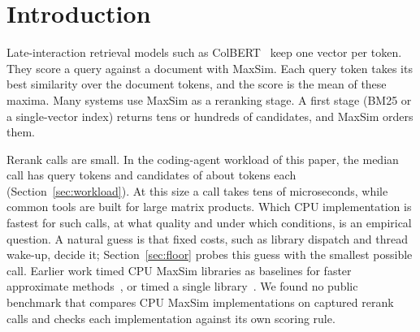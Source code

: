 \section{Introduction}
\label{sec:intro}

Late-interaction retrieval models such as ColBERT~\cite{khattab2020colbert,santhanam2022colbertv2} keep one vector per token.
They score a query against a document with MaxSim.
Each query token takes its best similarity over the document tokens, and the score is the mean of these maxima.
Many systems use MaxSim as a reranking stage.
A first stage (BM25 or a single-vector index) returns tens or hundreds of candidates, and MaxSim orders them.

Rerank calls are small.
In the coding-agent workload of this paper, the median call has  query tokens and  candidates of about  tokens each (Section~\ref{sec:workload}).
At this size a call takes tens of microseconds, while common tools are built for large matrix products.
Which CPU implementation is fastest for such calls, at what quality and under which conditions, is an empirical question.
A natural guess is that fixed costs, such as library dispatch and thread wake-up, decide it; Section~\ref{sec:floor} probes this guess with the smallest possible call.
Earlier work timed CPU MaxSim libraries as baselines for faster approximate methods~\cite{pony2026colbandit}, or timed a single library~\cite{clavie2025maxsimcpu}.
We found no public benchmark that compares CPU MaxSim implementations on captured rerank calls and checks each implementation against its own scoring rule.

